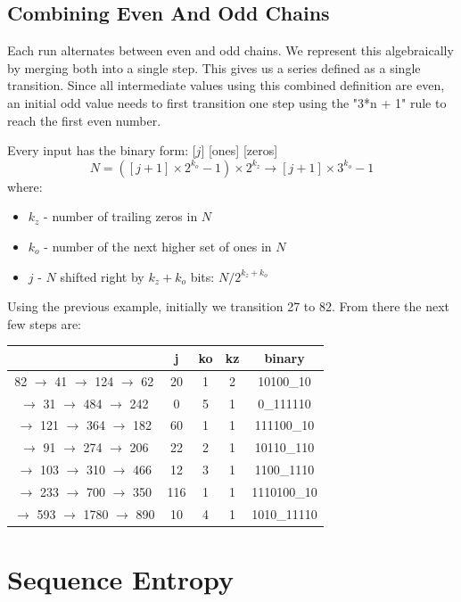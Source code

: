 \documentclass[letterpaper]{article}
\begin{document}
\begin{multicols}{2}
\subsection{Combining Even And Odd Chains}

Each run alternates between even and odd chains. We represent this algebraically by merging both into a single step. This gives us a series defined as a single transition. Since all intermediate values using this combined definition are even, an initial odd value needs to first transition one step using the "3*n + 1" rule to reach the first even number.

Every input has the binary form: [$j$] [ones] [zeros]
\[
N = ([j + 1] \times 2^{k_o} - 1) \times 2^{k_z} \rightarrow [j + 1] \times 3^{k_o} - 1
\]
where:
\begin{itemize}
    \item $k_z$ - number of trailing zeros in $N$
    \item $k_o$ - number of the next higher set of ones in $N$
    \item $j$ - $N$ shifted right by $k_z + k_o$ bits: $N / 2^{k_z + k_o}$
\end{itemize}

Using the previous example, initially we transition 27 to 82. From there the next few steps are:

\begin{center}
\begin{tabular}{|c|c|c|c|c|}
\hline
& \textbf{j} & \textbf{ko} & \textbf{kz}& \textbf{binary} \\ 
\hline
82 $\to$ 41  $\to$  124 $\to$ 62&20&1&2&10100\_10 \\ 
\hline
$\to$ 31  $\to$  484 $\to$ 242&0&5&1&0\_111110 \\ 
\hline
$\to$ 121 $\to$  364 $\to$ 182&60&1&1&111100\_10 \\ 
\hline
$\to$  91 $\to$  274 $\to$ 206&22&2&1&10110\_110 \\ 
\hline
$\to$ 103 $\to$  310 $\to$ 466&12&3&1&1100\_1110 \\ 
\hline
$\to$ 233 $\to$  700 $\to$ 350&116&1&1&1110100\_10 \\ 
\hline
$\to$ 593 $\to$ 1780 $\to$ 890&10&4&1&1010\_11110 \\ 
\hline
\end{tabular}
\end{center}

\section{Sequence Entropy}


\end{multicols}
\end{document}
